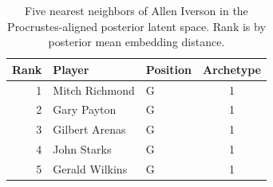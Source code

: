 \begin{table}[htbp]
  \centering\small
  \begin{tabular}{rllc}
    \toprule
    Rank & Player & Position & Archetype \\
    \midrule
    1 & Mitch Richmond & G & 1 \\
    2 & Gary Payton & G & 1 \\
    3 & Gilbert Arenas & G & 1 \\
    4 & John Starks & G & 1 \\
    5 & Gerald Wilkins & G & 1 \\
    \bottomrule
  \end{tabular}
  \caption{Five nearest neighbors of Allen Iverson in the Procrustes-aligned posterior latent space. Rank is by posterior mean embedding distance.}
  \label{tab:Allen_Iverson_neighbors}
\end{table}


